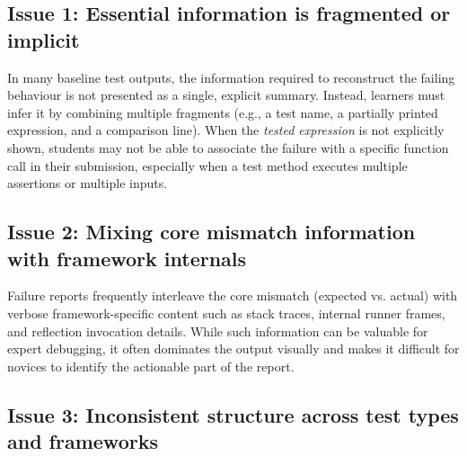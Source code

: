 \subsection{Issue 1: Essential information is fragmented or implicit} %
     \label{Issue 1: Essential information is fragmented or implicit} %


\begin{justify}
In many baseline test outputs, the information required to reconstruct the failing behaviour is not
presented as a single, explicit summary. Instead, learners must infer it by combining multiple
fragments (e.g., a test name, a partially printed expression, and a comparison line). When the
\emph{tested expression} is not explicitly shown, students may not be able to associate the failure
with a specific function call in their submission, especially when a test method executes multiple
assertions or multiple inputs.
\end{justify}


\subsection{Issue 2: Mixing core mismatch information with framework internals}%
     \label{Issue 2: Mixing core mismatch information with framework internals}%


\begin{justify}
	Failure reports frequently interleave the core mismatch (expected vs. actual) with verbose framework-specific content such as stack traces, internal runner frames,
	and reflection invocation details. While such information can be valuable for expert debugging, it often dominates the output visually and makes it difficult for novices to
	identify the actionable part of the report.
\end{justify}


\subsection{Issue 3: Inconsistent structure across test types and frameworks} %
     \label{Issue 3: Inconsistent structure across test types and frameworks} %


